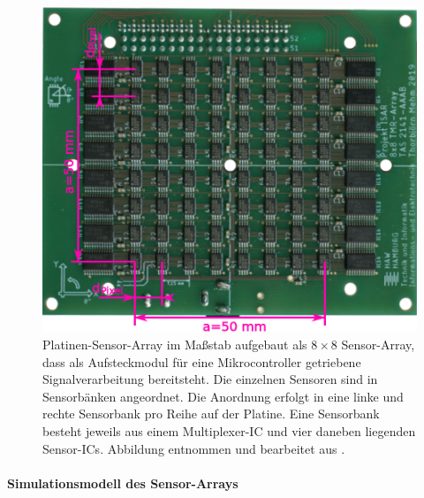 \begin{figure}[tph]
	\centering
	\includegraphics[width=0.5\linewidth]{chapters/images/1-Motivation/Sensor-Array-Platine-8x8}
	\caption[Platinen-Sensor-Array im Maßstab]{Platinen-Sensor-Array im Maßstab aufgebaut als $8\times8$ 
		Sensor-Array, dass als Aufsteckmodul für eine Mikrocontroller getriebene Signalverarbeitung bereitsteht. Die einzelnen Sensoren sind in Sensorbänken angeordnet. Die Anordnung erfolgt in eine linke und rechte Sensorbank pro Reihe auf der Platine. Eine Sensorbank besteht jeweils aus einem Multiplexer-IC und vier daneben liegenden Sensor-ICs. Abbildung entnommen und bearbeitet aus \cite{Mehm2019}.}
	\label{fig:sensor-array-platine-8x8}
\end{figure}


\paragraph{Simulationsmodell des Sensor-Arrays}\label{par:simulationsmodell-des-sensor-arrays}$~$\\


